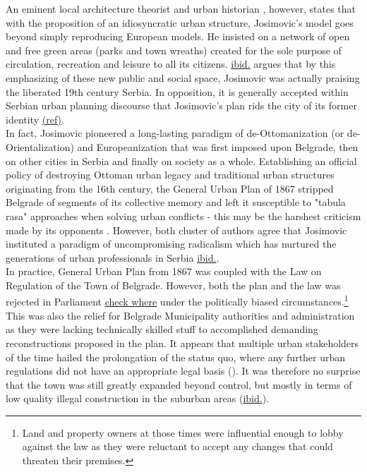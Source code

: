 \documentclass[11pt]{report}
\begin{document}
An eminent local architecture theorist and urban historian \href{}{\citealt{blagojevic_urban_2009}}, however, states that with the proposition of an idiosyncratic urban structure, Josimovic's model goes beyond simply reproducing European models.
He insisted on a network of open and free green areas (parks and town wreaths) created for the sole purpose of circulation, recreation and leisure to all its citizens. \href{}{ibid.} argues that by this emphasizing of  these new public and social space, Josimovic was actually praising the liberated 19th century Serbia.
In opposition, it is generally accepted within Serbian urban planning discourse that Josimovic's plan rids the city of its former identity \href{}{(ref)}.
\\

In fact, Josimovic pioneered a long-lasting paradigm of de-Ottomanization (or de-Orientalization) and Europeanization that was first imposed upon Belgrade, then on other cities in Serbia and finally on society as a whole. Establishing an official policy of destroying Ottoman urban legacy and traditional urban structures originating from the 16th century, the General Urban Plan of 1867 stripped Belgrade of segments of its collective memory and left it susceptible to "tabula rasa" approaches when solving urban conflicts - this may be the harshest criticism made by its opponents \href{}{\citealt{doytchinov_modernization_2015}}.
However, both cluster of authors agree that Josimovic instituted a paradigm of uncompromising radicalism which has nurtured the generations of urban professionals in Serbia \href{}{ibid.}.
\\

In practice, General Urban Plan from 1867 was coupled with the Law on Regulation of the Town of Belgrade. However, both the plan and the law was rejected in Parliament \href{}{check where} under the politically biased circumstances.\footnote{Land and property owners at those times were influential enough to lobby against the law as they were reluctant to accept any changes that could threaten their premises.}
This was also the relief for Belgrade Municipality authorities and administration as they were lacking technically skilled stuff to accomplished demanding reconstructions proposed in the plan.
It appears that multiple urban stakeholders of the time hailed the prolongation of the status quo, where any further urban regulations did not have an appropriate legal basis (\href{}{\citealt{doytchinov_modernization_2015}}). It was therefore no surprise that the town was still greatly  expanded  beyond  control,  but mostly in terms of  low quality illegal  construction  in the suburban areas (\href{}{ibid.}).
\\
\end{document}
